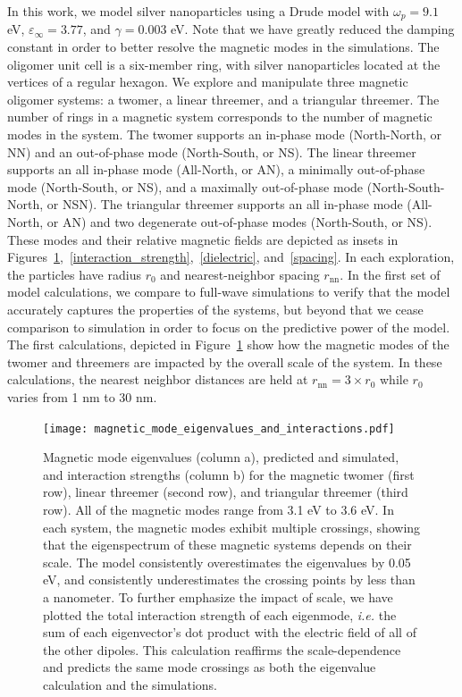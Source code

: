 \documentclass[journal=apchd5,manuscript=article]{achemso}
\begin{document}
In this work, we model silver nanoparticles using a Drude model with $\omega_p = 9.1$ eV, $\varepsilon_{\infty} = 3.77$, and $\gamma = 0.003$ eV. Note that we have greatly reduced the damping constant in order to better resolve the magnetic modes in the simulations. The oligomer unit cell is a six-member ring, with silver nanoparticles located at the vertices of a regular hexagon. We explore and manipulate three magnetic oligomer systems: a twomer, a linear threemer, and a triangular threemer. The number of rings in a magnetic system corresponds to the number of magnetic modes in the system\cite{Cherqui2014}. The twomer supports an in-phase mode (North-North, or NN) and an out-of-phase mode (North-South, or NS). The linear threemer supports an all in-phase mode (All-North, or AN), a minimally out-of-phase mode (North-South, or NS), and a maximally out-of-phase mode (North-South-North, or NSN). The triangular threemer supports an all in-phase mode (All-North, or AN) and two degenerate out-of-phase modes (North-South, or NS). These modes and their relative magnetic fields are depicted as insets in Figures~\ref{magmodes},~\ref{interaction_strength},~\ref{dielectric}, and~\ref{spacing}. In each exploration, the particles have radius $r_0$ and nearest-neighbor spacing $r_{\textrm{nn}}$. In the first set of model calculations, we compare to full-wave simulations to verify that the model accurately captures the properties of the systems, but beyond that we cease comparison to simulation in order to focus on the predictive power of the model. The first calculations, depicted in Figure~\ref{magmodes} show how the magnetic modes of the twomer and threemers are impacted by the overall scale of the system. In these calculations, the nearest neighbor distances are held at $r_{\textrm{nn}} = 3 \times r_0$ while $r_0$ varies from 1 nm to 30 nm.

\begin{figure}
\centering
\texttt{[image: magnetic\_mode\_eigenvalues\_and\_interactions.pdf]}
\caption{Magnetic mode eigenvalues (column a), predicted and simulated, and interaction strengths (column b) for the magnetic twomer (first row), linear threemer (second row), and triangular threemer (third row). All of the magnetic modes range from 3.1 eV to 3.6 eV. In each system, the magnetic modes exhibit multiple crossings, showing that the eigenspectrum of these magnetic systems depends on their scale. The model consistently overestimates the eigenvalues by 0.05 eV, and consistently underestimates the crossing points by less than a nanometer. To further emphasize the impact of scale, we have plotted the total interaction strength of each eigenmode, \textit{i.e.} the sum of each eigenvector's dot product with the electric field of all of the other dipoles. This calculation reaffirms the scale-dependence and predicts the same mode crossings as both the eigenvalue calculation and the simulations.}
\label{magmodes}
\end{figure}
\end{document}

